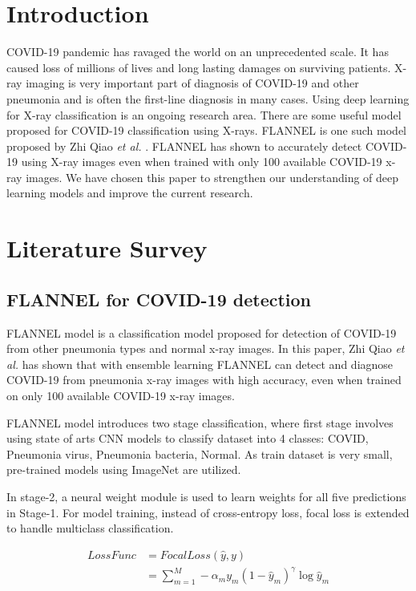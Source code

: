 \documentclass{sigkddExp}
\begin{document}
\section{Introduction}
COVID-19 pandemic has ravaged the world on an unprecedented scale. It has caused
loss of millions of lives and long lasting damages on surviving patients. X-ray
imaging is very important part of diagnosis of COVID-19 and other pneumonia and
is often the first-line diagnosis in many cases. Using deep learning for X-ray
classification is an ongoing research area. There are some useful model proposed
for COVID-19 classification using X-rays. FLANNEL is one such model proposed by
Zhi Qiao \textit{et al.} \cite{10.1093/jamia/ocaa280}. FLANNEL has shown to
accurately detect COVID-19 using X-ray images even when trained with only 100
available COVID-19 x-ray images. We have chosen this paper to strengthen our
understanding of deep learning models and improve the current research.

\section{Literature Survey}

\subsection{FLANNEL for COVID-19 detection}

FLANNEL model \cite{10.1093/jamia/ocaa280} is a classification model
proposed for detection of COVID-19 from other pneumonia types and normal x-ray images. 
In this paper, Zhi Qiao \textit{et al.} has shown that with ensemble learning
FLANNEL can detect and diagnose COVID-19 from pneumonia x-ray images with
high accuracy, even when trained on only 100 available COVID-19 x-ray images.

FLANNEL model introduces two stage classification, where first stage involves
using state of arts CNN models to classify dataset into 4 classes: COVID, Pneumonia virus, Pneumonia bacteria, Normal.
As train dataset is very small, pre-trained models using ImageNet are utilized.

In stage-2, a neural weight module is used to learn weights for all five predictions in Stage-1.
For model training, instead of cross-entropy loss, focal loss is extended to handle
multiclass classification.

\begin{align}
    LossFunc &=FocalLoss(\hat{y},y) \\
    &=\sum_{m=1}^{M} - \alpha_m y_m (1-\hat{y}_m)^\gamma \log{\hat{y}_m}
\end{align}
\end{document}

